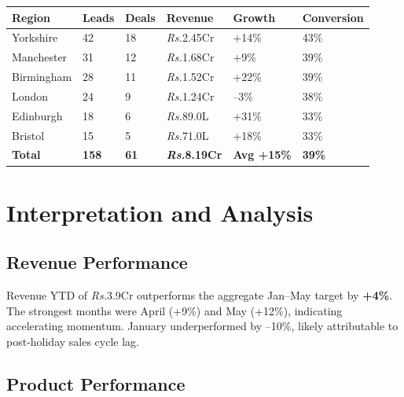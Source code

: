 \documentclass[12pt,a4paper]{report}
\newcommand{\rupee}{\textit{\textsf{\small Rs.}}}
\begin{document}
\vspace{4pt}
\begin{center}
\begin{tabular}{L{2.8cm} C{1.5cm} C{1.5cm} R{2.5cm} C{2cm} C{2cm}}
\toprule
{}
\color{white}\textbf{Region} &
\color{white}\textbf{Leads} &
\color{white}\textbf{Deals} &
\color{white}\textbf{Revenue} &
\color{white}\textbf{Growth} &
\color{white}\textbf{Conversion} \\
\midrule
{} Yorkshire  & 42 & 18 & \rupee{}2.45Cr & \textcolor{aspcvgreen}{+14\%} & 43\% \\
Manchester  & 31 & 12 & \rupee{}1.68Cr & \textcolor{aspcvgreen}{+9\%}  & 39\% \\
 Birmingham & 28 & 11 & \rupee{}1.52Cr & \textcolor{aspcvgreen}{+22\%} & 39\% \\
London      & 24 & 9  & \rupee{}1.24Cr & \textcolor{aspcvred}{--3\%}  & 38\% \\
 Edinburgh  & 18 & 6  & \rupee{}89.0L  & \textcolor{aspcvgreen}{+31\%} & 33\% \\
Bristol     & 15 & 5  & \rupee{}71.0L  & \textcolor{aspcvgreen}{+18\%} & 33\% \\
\midrule
{}
\textbf{Total} & \textbf{158} & \textbf{61} & \textbf{\rupee{}8.19Cr} & \textbf{Avg +15\%} & \textbf{39\%} \\
\bottomrule
\end{tabular}
\end{center}

\vspace{10mm}

\section{Interpretation and Analysis}

\subsection{Revenue Performance}

Revenue YTD of \rupee{}3.9Cr outperforms the aggregate Jan--May target by \textbf{+4\%}. The strongest months were April (+9\%) and May (+12\%), indicating accelerating momentum. January underperformed by --10\%, likely attributable to post-holiday sales cycle lag.

\subsection{Product Performance}
\end{document}
